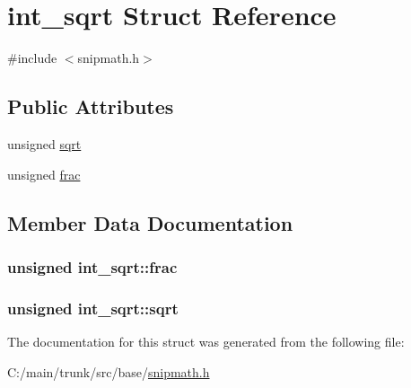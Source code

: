 \hypertarget{structint__sqrt}{
\section{int\_\-sqrt Struct Reference}
\label{structint__sqrt}
}


{\ttfamily \#include $<$snipmath.h$>$}\subsection*{Public Attributes}
\begin{DoxyCompactItemize}
\item 
unsigned \hyperlink{structint__sqrt_a54d4f52c83c9dc515b19bd95419f2173}{sqrt}
\item 
unsigned \hyperlink{structint__sqrt_a7fe7c595f400e6d0eb45f1fa33700dfe}{frac}
\end{DoxyCompactItemize}


\subsection{Member Data Documentation}
\hypertarget{structint__sqrt_a7fe7c595f400e6d0eb45f1fa33700dfe}{
\subsubsection[{frac}]{\setlength{\rightskip}{0pt plus 5cm}unsigned {\bf int\_\-sqrt::frac}}}
\label{structint__sqrt_a7fe7c595f400e6d0eb45f1fa33700dfe}
\hypertarget{structint__sqrt_a54d4f52c83c9dc515b19bd95419f2173}{
\subsubsection[{sqrt}]{\setlength{\rightskip}{0pt plus 5cm}unsigned {\bf int\_\-sqrt::sqrt}}}
\label{structint__sqrt_a54d4f52c83c9dc515b19bd95419f2173}


The documentation for this struct was generated from the following file:\begin{DoxyCompactItemize}
\item 
C:/main/trunk/src/base/\hyperlink{snipmath_8h}{snipmath.h}\end{DoxyCompactItemize}
